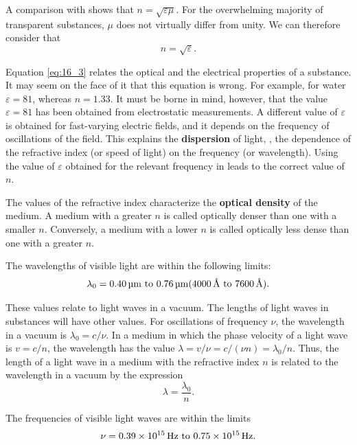 \noindent
A comparison with  shows that $n = \sqrt{\varepsilon\mu}$.
For the overwhelming majority of transparent substances, $\mu$ does not virtually differ from unity.
We can therefore consider that
\begin{equation}\label{eq:16_3}
    n = \sqrt{\varepsilon}.
\end{equation}

Equation \eqref{eq:16_3} relates the optical and the electrical properties of a substance.
It may seem on the face of it that this equation is wrong.
For example, for water $\varepsilon = 81$, whereas $n = 1.33$.
It must be borne in mind, however, that the value $\varepsilon = 81$ has been obtained from electrostatic measurements.
A different value of $\varepsilon$ is obtained for fast-varying electric fields, and it depends on the frequency of oscillations of the field.
This explains the \textbf{dispersion} of light, \ie, the dependence of the refractive index (or speed of light) on the frequency (or wavelength).
Using the value of $\varepsilon$ obtained for the relevant frequency in  leads to the correct value of $n$.

The values of the refractive index characterize the \textbf{optical density} of the medium.
A medium with a greater $n$ is called optically denser than one with a smaller $n$.
Conversely, a medium with a lower $n$ is called optically less dense than one with a greater $n$.

The wavelengths of visible light are within the following limits:
\begin{equation}\label{eq:16_4}
    \lambda_0 = \text{\SIrange{0.40}{0.76}{\micro\metre}} (\text{\SIrange{4000}{7600}{\angstrom}}).
\end{equation}

\noindent
These values relate to light waves in a vacuum.
The lengths of light waves in substances will have other values.
For oscillations of frequency $\nu$, the wavelength in a vacuum is $\lambda_0 = c/\nu$.
In a medium in which the phase velocity of a light wave is $v = c/n$, the wavelength has the value $\lambda = v/\nu = c/(\nu n) = \lambda_0/n$.
Thus, the length of a light wave in a medium with the refractive index $n$ is related to the wavelength in a vacuum by the expression
\begin{equation}\label{eq:16_5}
    \lambda = \frac{\lambda_0}{n}.
\end{equation}

The frequencies of visible light waves are within the limits
\begin{equation}\label{eq:16_6}
    \nu = \text{\SIrange{0.39e15}{0.75e15}{\hertz}}.
\end{equation}

